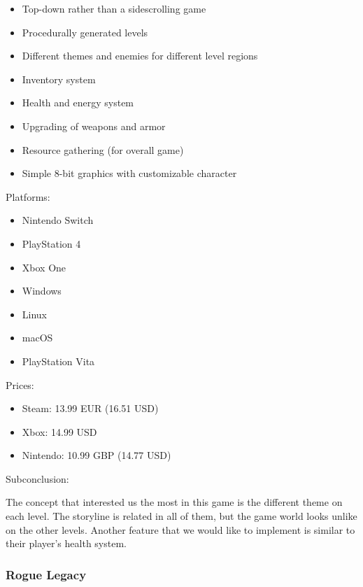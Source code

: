 \documentclass[12p]{article}
\begin{document}
\begin{itemize}
  \item Top-down rather than a sidescrolling game
  \item Procedurally generated levels
  \item Different themes and enemies for different level regions
  \item Inventory system
  \item Health and energy system
  \item Upgrading of weapons and armor
  \item Resource gathering (for overall game)
  \item Simple 8-bit graphics with customizable character
\end{itemize}

\newpage

Platforms:

\begin{itemize}
    \item Nintendo Switch
    \item PlayStation 4
    \item Xbox One
    \item Windows
    \item Linux
    \item macOS
    \item PlayStation Vita
\end{itemize}

Prices:

\begin{itemize}
  \item Steam: 13.99 EUR (16.51 USD)
  \item Xbox: 14.99 USD
  \item Nintendo: 10.99 GBP (14.77 USD)
\end{itemize}

Subconclusion:

The concept that interested us the most in this game is the different theme on each level. The storyline is related in all of them, but the game world looks unlike on the other levels. Another feature that we would like to implement is similar to their player's health system.


\newpage
\subsubsection[Rogue Legacy]{Rogue Legacy \cite{RogueLegacy}}
\end{document}

